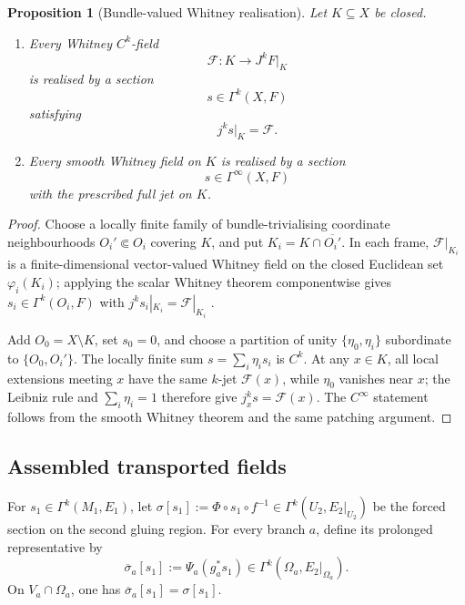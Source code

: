 \documentclass[11pt]{article}
\theoremstyle{plain}
\newtheorem{proposition}[theorem]{Proposition}
\theoremstyle{definition}
\begin{document}
\begin{proposition}[Bundle-valued Whitney realisation]
\label{prop:bundle-valued-whitney-extension}
Let \(K\subseteq X\) be closed.

\begin{enumerate}[label=\textup{(\roman*)}]
  \item Every Whitney \(C^k\)-field
        \[
          \mathcal F:K\longrightarrow J^k F|_K
        \]
        is realised by a section
        \[
          s\in\Gamma^k(X,F)
        \]
        satisfying
        \[
          j^k s|_K=\mathcal F.
        \]

  \item Every smooth Whitney field on \(K\) is realised by a section
        \[
          s\in\Gamma^\infty(X,F)
        \]
        with the prescribed full jet on \(K\).
\end{enumerate}
\end{proposition}

\begin{proof}
Choose a locally finite family of bundle-trivialising coordinate neighbourhoods \(O_i'\Subset O_i\) covering \(K\), and put \(K_i=K\cap\overline{O_i'}\). In each frame, \(\mathcal F|_{K_i}\) is a finite-dimensional vector-valued Whitney field on the closed Euclidean set \(\varphi_i(K_i)\); applying the scalar Whitney theorem componentwise gives \(s_i\in\Gamma^k(O_i,F)\) with \(j^ks_i|_{K_i}=\mathcal F|_{K_i}\) \citep{Whitney1934Extension,Fefferman2006Whitney,FeffermanLuli2014}.

Add \(O_0=X\setminus K\), set \(s_0=0\), and choose a partition of unity \(\{\eta_0,\eta_i\}\) subordinate to \(\{O_0,O_i'\}\). The locally finite sum \(s=\sum_i\eta_i s_i\) is \(C^k\). At any \(x\in K\), all local extensions meeting \(x\) have the same \(k\)-jet \(\mathcal F(x)\), while \(\eta_0\) vanishes near \(x\); the Leibniz rule and \(\sum_i\eta_i=1\) therefore give \(j_x^ks=\mathcal F(x)\). The \(C^\infty\) statement follows from the smooth Whitney theorem and the same patching argument.
\end{proof}

\subsection{Assembled transported fields}
\label{subsec:assembled-fields}

For
\(s_1\in\Gamma^k(M_1,E_1)\),
let \(\sigma[s_1] := \Phi\circ s_1\circ f^{-1} \in \Gamma^k(U_2,E_2|_{U_2})\) be the forced section on the second gluing region. For every branch
\(a\), define its prolonged representative by
\[
  \overline{\sigma}_a[s_1]
  :=
  \Psi_a(g_a^*s_1)
  \in
  \Gamma^k(\Omega_a,E_2|_{\Omega_a}).
\]
On
\(V_a\cap\Omega_a\),
one has
\(\overline{\sigma}_a[s_1] = \sigma[s_1]\).
\end{document}
